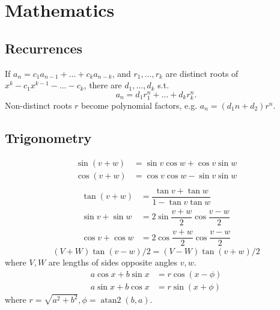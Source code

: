 
\chapter{Mathematics}





\section{Recurrences}
If $a_n = c_1 a_{n-1} + \dots + c_k a_{n-k}$, and $r_1, \dots, r_k$ are distinct roots of $x^k - c_1 x^{k-1} - \dots - c_k$, there are $d_1, \dots, d_k$ s.t.
\[a_n = d_1r_1^n + \dots + d_kr_k^n. \]
Non-distinct roots $r$ become polynomial factors, e.g. $a_n = (d_1n + d_2)r^n$.

\section{Trigonometry}
\begin{align*}
\sin(v+w)&{}=\sin v\cos w+\cos v\sin w\\
\cos(v+w)&{}=\cos v\cos w-\sin v\sin w\\
\end{align*}
\begin{align*}
\tan(v+w)&{}=\dfrac{\tan v+\tan w}{1-\tan v\tan w}\\
\sin v+\sin w&{}=2\sin\dfrac{v+w}{2}\cos\dfrac{v-w}{2}\\
\cos v+\cos w&{}=2\cos\dfrac{v+w}{2}\cos\dfrac{v-w}{2}
\end{align*}
\[ (V+W)\tan(v-w)/2{}=(V-W)\tan(v+w)/2 \]
where $V, W$ are lengths of sides opposite angles $v, w$.
\begin{align*}
	a\cos x+b\sin x&=r\cos(x-\phi)\\
	a\sin x+b\cos x&=r\sin(x+\phi)
\end{align*}
where $r=\sqrt{a^2+b^2}, \phi=\operatorname{atan2}(b,a)$.

